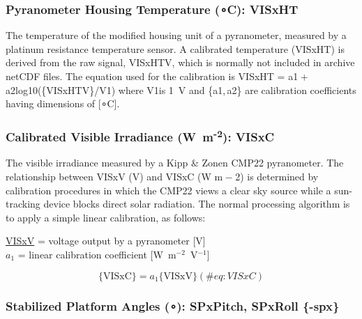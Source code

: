 \documentclass[
  english,
]{book}
\begin{document}
\hypertarget{visxht}{%
\subsubsection*{\texorpdfstring{Pyranometer Housing Temperature ({∘}C):
VISxHT}{Pyranometer Housing Temperature (∘C): VISxHT}}\label{visxht}}

The temperature of the modified housing unit of a pyranometer, measured
by a platinum resistance temperature sensor. A calibrated temperature
(VISxHT) is derived from the raw signal, VISxHTV, which is normally not
included in archive netCDF files. The equation used for the calibration
is VISxHT = {a1 + a2log10}(\{VISxHTV\}/{V1}) where {V1}is 1~V and
{\{a1, a2\}} are calibration coefficients having dimensions of
{{[}{∘}C{]}}.

\hypertarget{visxc}{%
\subsubsection*{\texorpdfstring{Calibrated Visible Irradiance
(W~m\textsuperscript{-2}):
VISxC}{Calibrated Visible Irradiance (W~m-2): VISxC}}\label{visxc}}

The visible irradiance measured by a Kipp \& Zonen CMP22 pyranometer.
The relationship between VISxV (V) and VISxC (W m{ − 2}) is determined
by calibration procedures in which the CMP22 views a clear sky source
while a sun-tracking device blocks direct solar radiation. The normal
processing algorithm is to apply a simple linear calibration, as
follows:

\protect\hyperlink{visxv}{VISxV} = voltage output by a pyranometer
{[}V{]}\\
\(a_{1}\) = linear calibration coefficient {[}W~m\(^{-2}\)~V\(^{-1}\){]}

\begin{equation}
\mathrm{\{VISxC\}}=a_{1}\mathrm{\{VISxV\}}
(\#eq:VISxC)
\end{equation}

\hypertarget{stabilized-platform-angles-spxpitch-spxroll--spx}{%
\subsubsection{\texorpdfstring{Stabilized Platform Angles ({∘}):
SPxPitch, SPxRoll
\{-spx\}}{Stabilized Platform Angles (∘): SPxPitch, SPxRoll \{-spx\}}}\label{stabilized-platform-angles-spxpitch-spxroll--spx}}
\end{document}
